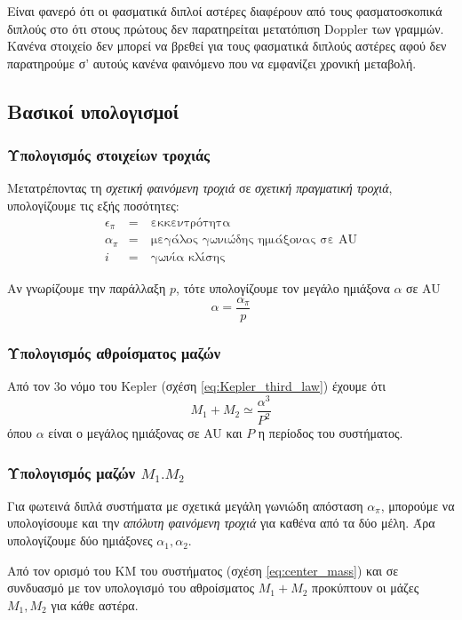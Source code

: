 \begin{enumerate}[label=(\Roman*)]
    Είναι φανερό ότι οι φασματικά διπλοί αστέρες διαφέρουν από τους φασματοσκοπικά διπλούς στο ότι στους πρώτους δεν παρατηρείται μετατόπιση Doppler των γραμμών. Κανένα στοιχείο δεν μπορεί να βρεθεί για τους φασματικά διπλούς αστέρες αφού δεν παρατηρούμε σ' αυτούς κανένα φαινόμενο που να εμφανίζει χρονική μεταβολή.
\end{enumerate}

\subsection{Βασικοί υπολογισμοί}

\subsubsection{Υπολογισμός στοιχείων τροχιάς}
Μετατρέποντας τη \textit{σχετική φαινόμενη τροχιά} σε \textit{σχετική πραγματική τροχιά}, υπολογίζουμε τις εξής ποσότητες:
\begin{eqnarray*}
    \epsilon_{\pi} &=& \ \text{εκκεντρότητα} \\
    \alpha_{\pi} &=& \ \text{μεγάλος γωνιώδης ημιάξονας σε AU} \\
    i &=& \ \text{γωνία κλίσης}
\end{eqnarray*}

Αν γνωρίζουμε την παράλλαξη $p$, τότε υπολογίζουμε τον μεγάλο ημιάξονα $\alpha$ σε AU
\begin{equation}
    \alpha = \frac{\alpha_{\pi}}{p}
\end{equation}

\subsubsection{Υπολογισμός αθροίσματος μαζών}
Από τον 3ο νόμο του Kepler (σχέση \eqref{eq:Kepler_third_law}) έχουμε ότι 
$$M_1 + M_2 \simeq \frac{\alpha ^3}{P^2}$$ όπου $\alpha$ είναι ο μεγάλος ημιάξονας σε AU και $P$ η περίοδος του συστήματος.


\subsubsection{Υπολογισμός μαζών $M_1. M_2$}
Για φωτεινά διπλά συστήματα με σχετικά μεγάλη γωνιώδη απόσταση $\alpha_{\pi}$, μπορούμε να υπολογίσουμε και την \textit{απόλυτη φαινόμενη τροχιά} για καθένα από τα δύο μέλη. Άρα υπολογίζουμε δύο ημιάξονες $\alpha_1, \alpha_2$.

Από τον ορισμό του ΚΜ του συστήματος (σχέση \eqref{eq:center_mass}) και σε συνδυασμό με τον υπολογισμό του αθροίσματος $M_1 + M_2$ προκύπτουν οι μάζες $M_1, M_2$ για κάθε αστέρα.


